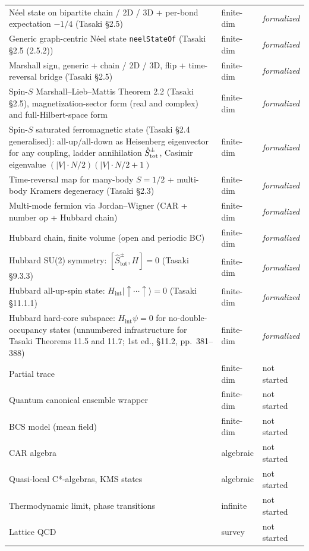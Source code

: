 \documentclass[a4paper,11pt]{article}
\begin{document}
\begin{center}
\begin{tabular}{lll}
Néel state on bipartite chain / 2D / 3D + per-bond expectation $-1/4$ (Tasaki §2.5) & finite-dim & \emph{formalized} \\
Generic graph-centric Néel state \texttt{neelStateOf} (Tasaki §2.5 (2.5.2)) & finite-dim & \emph{formalized} \\
Marshall sign, generic + chain / 2D / 3D, flip + time-reversal bridge (Tasaki §2.5) & finite-dim & \emph{formalized} \\
Spin-$S$ Marshall--Lieb--Mattis Theorem 2.2 (Tasaki §2.5), magnetization-sector form (real and complex) and full-Hilbert-space form & finite-dim & \emph{formalized} \\
Spin-$S$ saturated ferromagnetic state (Tasaki §2.4 generalised): all-up/all-down as Heisenberg eigenvector for any coupling, ladder annihilation $\hat S^\pm_{\rm tot}$, Casimir eigenvalue $(|V|\cdot N/2)(|V|\cdot N/2 + 1)$ & finite-dim & \emph{formalized} \\
Time-reversal map for many-body $S=1/2$ + multi-body Kramers degeneracy (Tasaki §2.3) & finite-dim & \emph{formalized} \\
Multi-mode fermion via Jordan--Wigner (CAR + number op + Hubbard chain) & finite-dim & \emph{formalized} \\
Hubbard chain, finite volume (open and periodic BC) & finite-dim & \emph{formalized} \\
Hubbard SU(2) symmetry: $[\hat{S}^{\pm}_{\mathrm{tot}}, H] = 0$ (Tasaki §9.3.3) & finite-dim & \emph{formalized} \\
Hubbard all-up-spin state: $H_{\mathrm{int}}|\!\!\uparrow\cdots\uparrow\rangle = 0$ (Tasaki §11.1.1) & finite-dim & \emph{formalized} \\
Hubbard hard-core subspace: $H_{\mathrm{int}}\psi=0$ for no-double-occupancy states (unnumbered infrastructure for Tasaki Theorems 11.5 and 11.7; 1st ed., §11.2, pp.~381--388) & finite-dim & \emph{formalized} \\
Partial trace & finite-dim & not started \\
Quantum canonical ensemble wrapper & finite-dim & not started \\
BCS model (mean field) & finite-dim & not started \\
CAR algebra & algebraic & not started \\
Quasi-local C*-algebras, KMS states & algebraic & not started \\
Thermodynamic limit, phase transitions & infinite & not started \\
Lattice QCD & survey & not started \\
\hline
\end{tabular}
\end{center}
\end{document}
